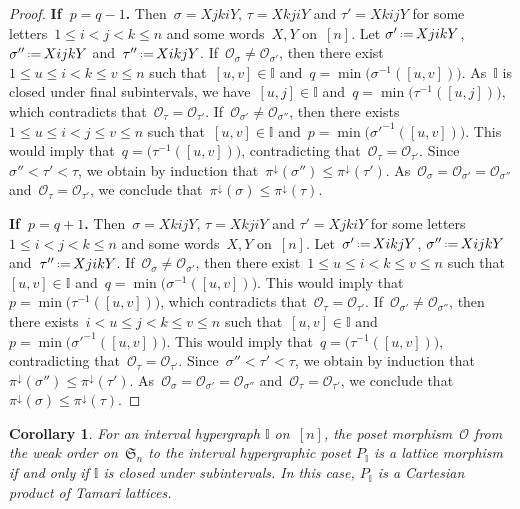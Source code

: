 \documentclass{amsart}
\newtheorem{corollary}[theorem]{Corollary}
\theoremstyle{definition}
\newcommand{\eqdef}{\mbox{\,\raisebox{0.2ex}{\scriptsize\ensuremath{\mathrm:}}\ensuremath{=}\,}} %
\newcommand{\para}[1]{\medskip\noindent\textbf{#1}} %
\newcommand{\fS}{\mathfrak{S}} %
\newcommand{\projDown}{\pi^\downarrow} %
\newcommand{\Or}{\mathcal O}  %
\newcommand{\II}{\mathbb I} %
\begin{document}
\begin{proof}
\para{If~$p = q-1$.} Then~$\sigma = X j k i Y$, $\tau = X k j i Y$ and $\tau' = X k i j Y$ for some letters~$1 \le i < j < k \le n$ and some words~$X,Y$ on~$[n]$.
Let $\sigma' \eqdef X j i k Y$, $\sigma'' \eqdef X i j k Y$ and~$\tau'' \eqdef X i k j Y$.
If~$\Or_\sigma \ne \Or_{\sigma'}$, then there exist~$1 \le u \le i < k \le v \le n$ such that~$[u,v] \in \II$ and~$q = \min \big( \sigma^{-1}([u,v]) \big)$. 
As~$\II$ is closed under final subintervals, we have~$[u,j] \in \II$ and~$q = \min \big( \tau^{-1}([u,j]) \big)$, which contradicts that~$\Or_\tau = \Or_{\tau'}$.
If~$\Or_{\sigma'} \ne \Or_{\sigma''}$, then there exists~$1 \le u \le i < j \le v \le n$ such that~$[u,v] \in \II$ and~$p = \min \big( \sigma'^{-1}([u,v]) \big)$. 
This would imply that~$q = \big( \tau^{-1}([u,v]) \big)$, contradicting that~${\Or_\tau = \Or_{\tau'}}$.
Since~$\sigma'' < \tau' < \tau$, we obtain by induction that~$\projDown(\sigma'') \le \projDown(\tau')$.
As~$\Or_\sigma = \Or_{\sigma'} = \Or_{\sigma''}$ and~${\Or_\tau = \Or_{\tau'}}$, we conclude that~$\projDown(\sigma) \le \projDown(\tau)$.

\para{If~$p = q+1$.} Then~$\sigma = X k i j Y$, $\tau = X k j i Y$ and $\tau' = X j k i Y$ for some letters~${1 \le i < j < k \le n}$ and some words~$X,Y$ on~$[n]$.
Let~$\sigma' \eqdef X i k j Y$, $\sigma'' \eqdef X i j k Y$ and~$\tau'' \eqdef X j i k Y$. 
If~$\Or_\sigma \ne \Or_{\sigma'}$, then there exist~$1 \le u \le i < k \le v \le n$ such that~$[u,v] \in \II$ and~$q = \min \big( \sigma^{-1}([u,v]) \big)$.
This would imply that~$p = \min \big( \tau^{-1}([u,v]) \big)$, which contradicts that~$\Or_\tau = \Or_{\tau'}$.
If~$\Or_{\sigma'} \ne \Or_{\sigma''}$, then there exists~$i < u \le j < k \le v \le n$ such that~$[u,v] \in \II$ and~$p = \min \big( \sigma'^{-1}([u,v]) \big)$. 
This would imply that~$q = \big( \tau^{-1}([u,v]) \big)$, contradicting that~$\Or_\tau = \Or_{\tau'}$.
Since~$\sigma'' < \tau' < \tau$, we obtain by induction that~$\projDown(\sigma'') \le \projDown(\tau')$.
As~$\Or_\sigma = \Or_{\sigma'} = \Or_{\sigma''}$ and~$\Or_\tau = \Or_{\tau'}$, we conclude that~$\projDown(\sigma) \le \projDown(\tau)$.
\end{proof}

\begin{corollary}
\label{coro:quotientLatticeI}
For an interval hypergraph $\II$ on~$[n]$, the poset morphism~$\Or$ from the weak order on~$\fS_n$ to the interval hypergraphic poset $P_\II$ is a lattice morphism if and only if $\II$ is closed under subintervals.
In this case, $P_\II$ is a Cartesian product of Tamari lattices.
\end{corollary}
\end{document}
